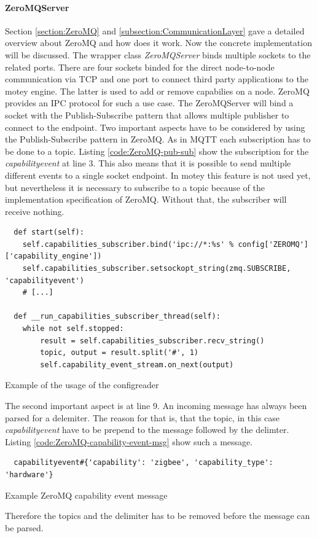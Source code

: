\paragraph{ZeroMQServer}
Section \ref{section:ZeroMQ} and \ref{subsection:CommunicationLayer} gave a detailed overview about ZeroMQ and how does it work.
Now the concrete implementation will be discussed.
The wrapper class \textit{ZeroMQServer} binds multiple sockets to the related ports.
There are four sockets binded for the direct node-to-node communication via \ac{TCP} and one port to connect third party applications to the motey engine.
The latter is used to add or remove capabilies on a node.
ZeroMQ provides an \ac{IPC} protocol for such a use case.
The ZeroMQServer will bind a socket with the Publish-Subscribe pattern that allows multiple publisher to connect to the endpoint.
Two important aspects have to be considered by using the Publish-Subscribe pattern in ZeroMQ.
As in \ac{MQTT} each subscription has to be done to a topic.
Listing \ref{code:ZeroMQ-pub-sub} show the subscription for the \textit{capabilityevent} at line 3.
This also means that it is possible to send multiple different events to a single socket endpoint.
In motey this feature is not used yet, but nevertheless it is necessary to subscribe to a topic because of the implementation specification of ZeroMQ.
Without that, the subscriber will receive nothing.

\begin{listing}[H]
  \begin{verbatim}
  def start(self):
    self.capabilities_subscriber.bind('ipc://*:%s' % config['ZEROMQ']['capability_engine'])
    self.capabilities_subscriber.setsockopt_string(zmq.SUBSCRIBE, 'capabilityevent')
    # [...]

  def __run_capabilities_subscriber_thread(self):
    while not self.stopped:
        result = self.capabilities_subscriber.recv_string()
        topic, output = result.split('#', 1)
        self.capability_event_stream.on_next(output)
  \end{verbatim}
  \caption{Example of the usage of the configreader}
  \label{code:ZeroMQ-pub-sub}
\end{listing}

The second important aspect is at line 9.
An incoming message has always been parsed for a delemiter.
The reason for that is, that the topic, in this case \textit{capabilityevent} have to be prepend to the message followed by the delimter.
Listing \ref{code:ZeroMQ-capability-event-msg} show such a message.
\begin{listing}[H]
  \begin{verbatim}
  capabilityevent#{'capability': 'zigbee', 'capability_type': 'hardware'}
  \end{verbatim}
  \caption{Example ZeroMQ capability event message}
  \label{code:ZeroMQ-capability-event-msg}
\end{listing}
Therefore the topics and the delimiter has to be removed before the message can be parsed.

